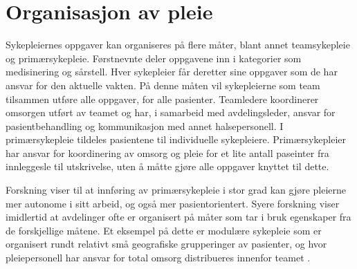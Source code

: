 \section{Organisasjon av pleie}
\label{sec:pleie}

Sykepleiernes oppgaver kan organiseres på flere måter, blant annet teamsykepleie og primærsykepleie. Førstnevnte deler oppgavene inn i kategorier som medisinering og sårstell. Hver sykepleier får deretter sine oppgaver som de har ansvar for den aktuelle vakten. På denne måten vil sykepleierne som team tilsammen utføre alle oppgaver, for alle pasienter. Teamledere koordinerer omsorgen utført av teamet og har, i samarbeid med avdelingsleder, ansvar for pasientbehandling og kommunikasjon med annet halsepersonell. I primærsykepleie tildeles pasientene til individuelle sykepleiere. Primærsykepleier har ansvar for koordinering av omsorg og pleie for et lite antall paseinter fra innleggesle til utskrivelse, uten å måtte gjøre alle oppgaver knyttet til dette. 

\noindent
Forskning viser til at innføring av primærsykepleie i stor grad kan gjøre pleierne mer autonome i sitt arbeid, og også mer pasientorientert. Syere forskning viser imidlertid at avdelinger ofte er organisert på måter som tar i bruk egenskaper fra de forskjellige måtene. Et eksempel på dette er modulære sykepleie som er organisert rundt relativt små geografiske grupperinger av pasienter, og hvor pleiepersonell har ansvar for total omsorg distribueres innenfor teamet \citep{Rygh}.
